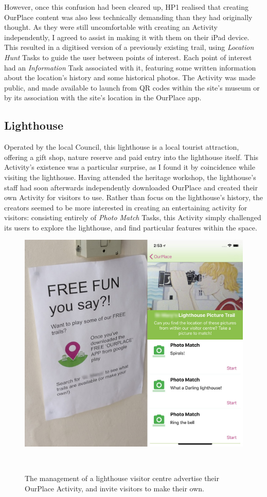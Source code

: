 However, once this confusion had been cleared up, HP1 realised that creating OurPlace content was also less technically demanding than they had originally thought. As they were still uncomfortable with creating an Activity independently, I agreed to assist in making it with them on their iPad device. This resulted in a digitised version of a previously existing trail, using \textit{Location Hunt} Tasks to guide the user between points of interest. Each point of interest had an \textit{Information} Task associated with it, featuring some written information about the location's history and some historical photos. The Activity was made public, and made available to launch from QR codes within the site's museum or by its association with the site's location in the OurPlace app.

\subsection{Lighthouse}
\label{app:lighthouse}

Operated by the local Council, this lighthouse is a local tourist attraction, offering a gift shop, nature reserve and paid entry into the lighthouse itself. This Activity's existence was a particular surprise, as I found it by coincidence while visiting the lighthouse. Having attended the heritage workshop, the lighthouse's staff had soon afterwards independently downloaded OurPlace and created their own Activity for visitors to use. Rather than focus on the lighthouse's history, the creators seemed to be more interested in creating an entertaining activity for visitors: consisting entirely of \textit{Photo Match} Tasks, this Activity simply challenged its users to explore the lighthouse, and find particular features within the space.

\begin{figure}
  \centering
  \includegraphics[width=0.65\columnwidth]{images/chapter06/OurPlaceLighthouse.jpg}
  \caption[An OurPlace Activity at a lighthouse]{The management of a lighthouse visitor centre advertise their OurPlace Activity, and invite visitors to make their own.}~\label{fig:OurPlaceLighthouse}
\end{figure}

